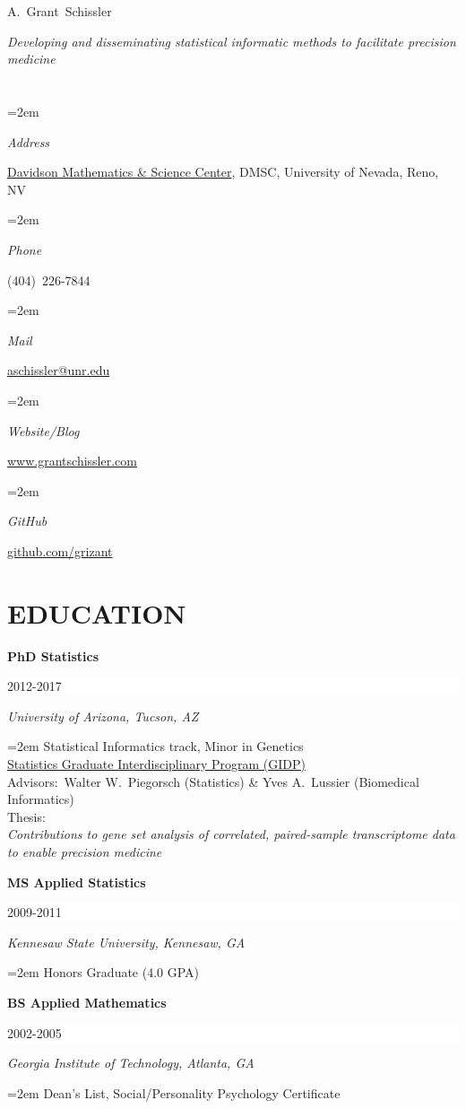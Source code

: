 \documentclass[paper=a4,fontsize=11pt]{scrartcl} %
\newlength{\spacebox}
\newcommand{\sepspace}{\vspace*{1em}}		%
\newcommand{\MyName}[1]{ %
		\LARGE \usefont{OT1}{phv}{b}{n} \hfill #1
		\par \normalsize \normalfont}
\newcommand{\MySlogan}[1]{ %
		\large \usefont{OT1}{phv}{m}{n}\hfill \textit{#1}
		\par \normalsize \normalfont}
\newcommand{\NewPart}[2]{\section*{\uppercase{#1} #2 }}
\newcommand{\PersonalEntry}[2]{
		\noindent\hangindent=2em\hangafter=0 %
		\parbox{\spacebox}{        %
		\textit{#1}}		       %
		\hspace{1.5em} #2 \par}    %
\newcommand{\EducationEntry}[4]{
		\noindent \textbf{#1} \hfill      %
		\colorbox{White}{%
			\parbox{6em}{%
			\hfill\color{Black}#2}} \par  %
		\noindent \textit{#3} \par        %
		\noindent\hangindent=2em\hangafter=0 \small #4 %
		\normalsize \par \vspace{-7pt}}
\begin{document}
 


\MyName{A.~Grant~Schissler}
\vspace{5pt}
\textit{Developing and disseminating statistical informatic methods to facilitate precision medicine}
\vspace{-20pt}

\NewPart{}{}
\vspace{-8pt}
\PersonalEntry{Address}{\href{https://www.google.com/maps/place/Davidson+Mathematics+\%26+Science+Center,+Reno,+NV+89557/@39.539006,-119.8146246,17z/data=!3m1!4b1!4m5!3m4!1s0x809947387fd92c01:0xb648889cd182b3ae!8m2!3d39.538944!4d-119.8123508}{Davidson Mathematics \& Science Center}, DMSC, University of Nevada, Reno, NV}
\PersonalEntry{Phone}{(404)~226-7844}
\PersonalEntry{Mail}{\href{mailto:aschissler@unr.edu}{aschissler@unr.edu}}
\PersonalEntry{Website/Blog}{\href{http://www.grantschissler.com}{www.grantschissler.com}}
\PersonalEntry{GitHub}{\href{https://github.com/grizant}{github.com/grizant}}
\vspace{-7pt}
\NewPart{Education}{}
\vspace{-7pt}
\EducationEntry{PhD Statistics}{2012-2017}{University of Arizona, Tucson, AZ}{Statistical Informatics track, Minor in Genetics\\\href{http://stat.arizona.edu}{Statistics Graduate Interdisciplinary Program (GIDP)}\\Advisors:~Walter W.~Piegorsch (Statistics) \& Yves A.~Lussier (Biomedical Informatics)\\Thesis:\\\textit{Contributions to gene set analysis of correlated, paired-sample transcriptome data to enable precision medicine}}
\sepspace

\EducationEntry{MS Applied Statistics}{2009-2011}{Kennesaw State University, Kennesaw, GA}{Honors Graduate (4.0 GPA)}
\sepspace

\EducationEntry{BS Applied Mathematics}{2002-2005}{Georgia Institute of Technology, Atlanta, GA}{Dean's List, Social/Personality Psychology Certificate}
\end{document}
